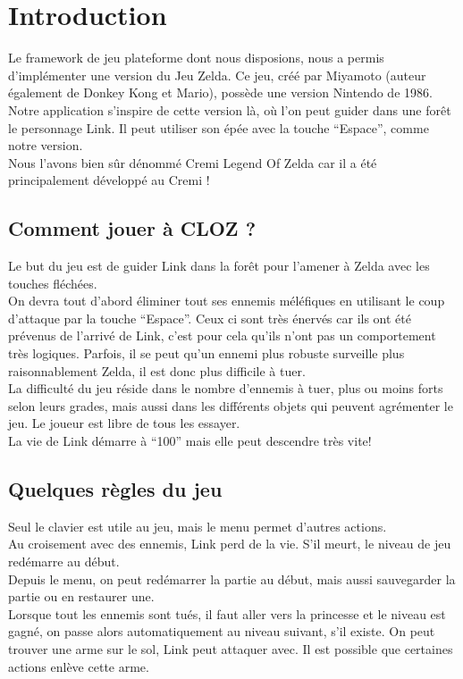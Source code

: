 \documentclass[a4paper,11pt]{article}
\begin{document}
\newpage

\section{Introduction}
Le framework de jeu plateforme dont nous disposions, nous a permis
d'implémenter une version du Jeu Zelda. Ce jeu, créé par Miyamoto (auteur
également de Donkey Kong et Mario), possède une version Nintendo de 1986. \\

Notre application s'inspire de cette version là, où l'on peut guider dans une
forêt le personnage Link. Il peut utiliser son épée avec la touche ``Espace'', comme notre version. \\
Nous l'avons bien sûr dénommé Cremi Legend Of Zelda car il a été principalement
développé au Cremi !

\subsection{Comment jouer à CLOZ ?}
Le but du jeu est de guider Link dans la forêt pour l'amener à Zelda avec les
touches fléchées. \\ 
On devra tout d'abord éliminer tout ses ennemis méléfiques en utilisant le coup
d'attaque par la touche ``Espace''. Ceux ci sont très énervés car
ils ont été prévenus de l'arrivé de Link, c'est pour cela qu'ils n'ont pas un
comportement très logiques. Parfois, il se peut qu'un ennemi plus robuste
surveille plus raisonnablement Zelda, il est donc plus difficile à tuer.\\

La difficulté du jeu réside dans le nombre d'ennemis à tuer, plus ou moins
forts selon leurs grades, mais aussi dans les différents objets
qui peuvent agrémenter le jeu. Le joueur est libre de tous les essayer.\\

La vie de Link démarre à ``100'' mais elle peut descendre très vite!

\subsection{Quelques règles du jeu}
Seul le clavier est utile au jeu, mais le menu permet d'autres actions.\\
Au croisement avec des ennemis, Link perd de la vie. S'il meurt, le niveau de
jeu redémarre au début. \\
Depuis le menu, on peut redémarrer la partie au début, mais aussi sauvegarder la
partie ou en restaurer une.\\
Lorsque tout les ennemis sont tués, il faut aller vers la princesse et le
niveau est gagné, on passe alors automatiquement au niveau suivant, s'il existe.
On peut trouver une arme sur le sol, Link peut attaquer avec. Il est possible
que certaines actions enlève cette arme. 
\end{document}

